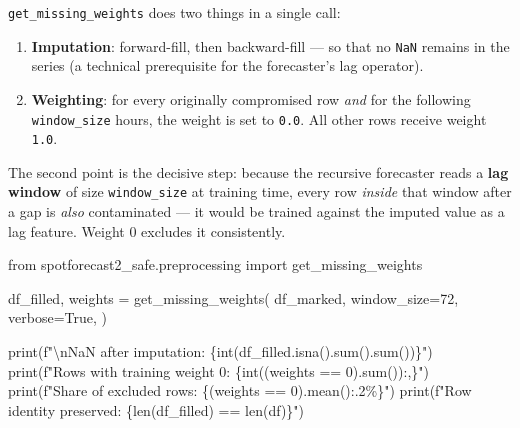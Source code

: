 \documentclass[
  english,
  letterpaper,
]{scrbook}
\newenvironment{Shaded}{\begin{snugshade}}{\end{snugshade}}
\newcommand{\BuiltInTok}[1]{\textcolor[rgb]{0.00,0.23,0.31}{#1}}
\newcommand{\CharTok}[1]{\textcolor[rgb]{0.13,0.47,0.30}{#1}}
\newcommand{\DecValTok}[1]{\textcolor[rgb]{0.68,0.00,0.00}{#1}}
\newcommand{\ImportTok}[1]{\textcolor[rgb]{0.00,0.46,0.62}{#1}}
\newcommand{\NormalTok}[1]{\textcolor[rgb]{0.00,0.23,0.31}{#1}}
\newcommand{\OperatorTok}[1]{\textcolor[rgb]{0.37,0.37,0.37}{#1}}
\newcommand{\SpecialCharTok}[1]{\textcolor[rgb]{0.37,0.37,0.37}{#1}}
\newcommand{\SpecialStringTok}[1]{\textcolor[rgb]{0.13,0.47,0.30}{#1}}
\newcommand{\VariableTok}[1]{\textcolor[rgb]{0.07,0.07,0.07}{#1}}
\providecommand{\tightlist}{%
  \setlength{\itemsep}{0pt}\setlength{\parskip}{0pt}}
\begin{document}
\texttt{get\_missing\_weights} does two things in a single call:

\begin{enumerate}
\def\labelenumi{\arabic{enumi}.}
\tightlist
\item
  \textbf{Imputation}: forward-fill, then backward-fill --- so that no
  \texttt{NaN} remains in the series (a technical prerequisite for the
  forecaster's lag operator).
\item
  \textbf{Weighting}: for every originally compromised row \emph{and}
  for the following \texttt{window\_size} hours, the weight is set to
  \texttt{0.0}. All other rows receive weight \texttt{1.0}.
\end{enumerate}

The second point is the decisive step: because the recursive forecaster
reads a \textbf{lag window} of size \texttt{window\_size} at training
time, every row \emph{inside} that window after a gap is \emph{also}
contaminated --- it would be trained against the imputed value as a lag
feature. Weight 0 excludes it consistently.

\protect{}\label{weights}
\begin{Shaded}
\begin{Highlighting}[]
\ImportTok{from}\NormalTok{ spotforecast2\_safe.preprocessing }\ImportTok{import}\NormalTok{ get\_missing\_weights}

\NormalTok{df\_filled, weights }\OperatorTok{=}\NormalTok{ get\_missing\_weights(}
\NormalTok{    df\_marked,}
\NormalTok{    window\_size}\OperatorTok{=}\DecValTok{72}\NormalTok{,}
\NormalTok{    verbose}\OperatorTok{=}\VariableTok{True}\NormalTok{,}
\NormalTok{)}

\BuiltInTok{print}\NormalTok{(}\SpecialStringTok{f"}\CharTok{\textbackslash{}n}\SpecialStringTok{NaN after imputation:                }\SpecialCharTok{\{}\BuiltInTok{int}\NormalTok{(df\_filled.isna().}\BuiltInTok{sum}\NormalTok{().}\BuiltInTok{sum}\NormalTok{())}\SpecialCharTok{\}}\SpecialStringTok{"}\NormalTok{)}
\BuiltInTok{print}\NormalTok{(}\SpecialStringTok{f"Rows with training weight 0:        }\SpecialCharTok{\{}\BuiltInTok{int}\NormalTok{((weights }\OperatorTok{==} \DecValTok{0}\NormalTok{).}\BuiltInTok{sum}\NormalTok{())}\SpecialCharTok{:,\}}\SpecialStringTok{"}\NormalTok{)}
\BuiltInTok{print}\NormalTok{(}\SpecialStringTok{f"Share of excluded rows:             }\SpecialCharTok{\{}\NormalTok{(weights }\OperatorTok{==} \DecValTok{0}\NormalTok{)}\SpecialCharTok{.}\NormalTok{mean()}\SpecialCharTok{:.2\%\}}\SpecialStringTok{"}\NormalTok{)}
\BuiltInTok{print}\NormalTok{(}\SpecialStringTok{f"Row identity preserved:             }\SpecialCharTok{\{}\BuiltInTok{len}\NormalTok{(df\_filled) }\OperatorTok{==} \BuiltInTok{len}\NormalTok{(df)}\SpecialCharTok{\}}\SpecialStringTok{"}\NormalTok{)}
\end{Highlighting}
\end{Shaded}
\end{document}
